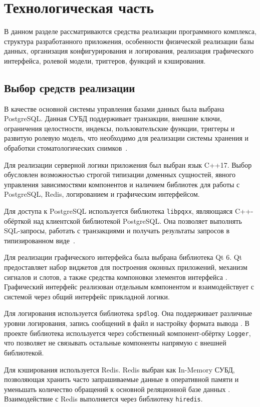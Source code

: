 \chapter{Технологическая часть}

В данном разделе рассматриваются средства реализации программного комплекса, структура разработанного приложения, особенности физической реализации базы данных, организация конфигурирования и логирования, реализация графического интерфейса, ролевой модели, триггеров, функций и кэширования.

\section{Выбор средств реализации}

В качестве основной системы управления базами данных была выбрана PostgreSQL. Данная СУБД поддерживает транзакции, внешние ключи, ограничения целостности, индексы, пользовательские функции, триггеры и развитую ролевую модель, что необходимо для реализации системы хранения и обработки стоматологических снимков~\cite{postgresql_docs}.

Для реализации серверной логики приложения был выбран язык C++17. Выбор обусловлен возможностью строгой типизации доменных сущностей, явного управления зависимостями компонентов и наличием библиотек для работы с PostgreSQL, Redis, логированием и графическим интерфейсом.

Для доступа к PostgreSQL используется библиотека \texttt{libpqxx}, являющаяся C++-обёрткой над клиентской библиотекой PostgreSQL. Она позволяет выполнять SQL-запросы, работать с транзакциями и получать результаты запросов в типизированном виде~\cite{libpqxx_docs}.

Для реализации графического интерфейса была выбрана библиотека Qt 6. Qt предоставляет набор виджетов для построения оконных приложений, механизм сигналов и слотов, а также средства компоновки элементов интерфейса \cite{qt_docs}. Графический интерфейс реализован отдельным компонентом и взаимодействует с системой через общий интерфейс прикладной логики.

Для логирования используется библиотека \texttt{spdlog}. Она поддерживает различные уровни логирования, запись сообщений в файл и настройку формата вывода \cite{spdlog_docs}. В проекте библиотека используется через собственный компонент-обёртку \texttt{Logger}, что позволяет не связывать остальные компоненты напрямую с внешней библиотекой.

Для кэширования используется Redis. Redis выбран как In-Memory СУБД, позволяющая хранить часто запрашиваемые данные в оперативной памяти и уменьшать количество обращений к основной реляционной базе данных \cite{redis_docs}. Взаимодействие с Redis выполняется через библиотеку \texttt{hiredis}.


